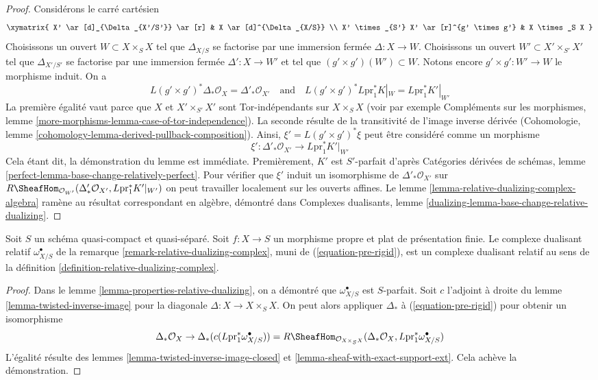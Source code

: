 \begin{proof}
Considérons le carré cartésien
$$
\xymatrix{
X' \ar[d]_{\Delta_{X'/S'}} \ar[r] & X \ar[d]^{\Delta_{X/S}} \\
X' \times_{S'} X' \ar[r]^{g' \times g'} & X \times_S X
}
$$
Choisissons un ouvert $W \subset X \times_S X$ tel que $\Delta_{X/S}$ se factorise par une immersion fermée $\Delta : X \to W$. Choisissons un ouvert $W' \subset X' \times_{S'} X'$ tel que $\Delta_{X'/S'}$ se factorise par une immersion fermée $\Delta' : X \to W'$ et tel que $(g' \times g')(W') \subset W$. Notons encore $g' \times g' : W' \to W$ le morphisme induit. On a
$$
L(g' \times g')^*\Delta_*\mathcal{O}_X =
\Delta'_*\mathcal{O}_{X'}
\quad\text{and}\quad
L(g' \times g')^*L\text{pr}_1^*K|_W =
L\text{pr}_1^*K'|_{W'}
$$
La première égalité vaut parce que $X$ et $X' \times_{S'} X'$ sont Tor-indépendants sur $X \times_S X$ (voir par exemple Compléments sur les morphismes, lemme \ref{more-morphisms-lemma-case-of-tor-independence}). La seconde résulte de la transitivité de l'image inverse dérivée (Cohomologie, lemme \ref{cohomology-lemma-derived-pullback-composition}). Ainsi, $\xi' = L(g' \times g')^*\xi$ peut être considéré comme un morphisme
$$
\xi' : \Delta'_*\mathcal{O}_{X'} \longrightarrow L\text{pr}_1^*K'|_{W'}
$$
Cela étant dit, la démonstration du lemme est immédiate. Premièrement, $K'$ est $S'$-parfait d'après Catégories dérivées de schémas, lemme \ref{perfect-lemma-base-change-relatively-perfect}. Pour vérifier que $\xi'$ induit un isomorphisme de $\Delta'_*\mathcal{O}_{X'}$ sur
$R\SheafHom_{\mathcal{O}_{W'}}(
\Delta'_*\mathcal{O}_{X'}, L\text{pr}_1^*K'|_{W'})$
on peut travailler localement sur les ouverts affines. Le lemme \ref{lemma-relative-dualizing-complex-algebra} ramène au résultat correspondant en algèbre, démontré dans Complexes dualisants, lemme \ref{dualizing-lemma-base-change-relative-dualizing}.
\end{proof}

\begin{lemma}
\label{lemma-flat-proper-relative-dualizing}
Soit $S$ un schéma quasi-compact et quasi-séparé. Soit $f : X \to S$ un morphisme propre et plat de présentation finie. Le complexe dualisant relatif $\omega_{X/S}^\bullet$ de la remarque \ref{remark-relative-dualizing-complex}, muni de (\ref{equation-pre-rigid}), est un complexe dualisant relatif au sens de la définition \ref{definition-relative-dualizing-complex}.
\end{lemma}

\begin{proof}
Dans le lemme \ref{lemma-properties-relative-dualizing}, on a démontré que $\omega_{X/S}^\bullet$ est $S$-parfait. Soit $c$ l'adjoint à droite du lemme \ref{lemma-twisted-inverse-image} pour la diagonale $\Delta : X \to X \times_S X$. On peut alors appliquer $\Delta_*$ à (\ref{equation-pre-rigid}) pour obtenir un isomorphisme
$$
\Delta_*\mathcal{O}_X \to
\Delta_*(c(L\text{pr}_1^*\omega_{X/S}^\bullet)) =
R\SheafHom_{\mathcal{O}_{X \times_S X}}(
\Delta_*\mathcal{O}_X, L\text{pr}_1^*\omega_{X/S}^\bullet)
$$
L'égalité résulte des lemmes \ref{lemma-twisted-inverse-image-closed} et \ref{lemma-sheaf-with-exact-support-ext}. Cela achève la démonstration.
\end{proof}

